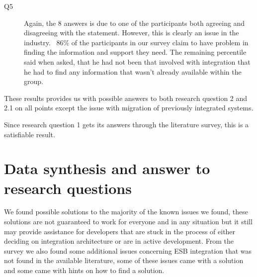 \documentclass{llncs}
\begin{document}
\begin{description}
\item[Q5] Again, the 8 answers is due to one of the participants both agreeing and disagreeing with the statement. However, this is clearly an issue in the industry. ~86\% of the participants in our survey claim to have problem in finding the information and support they need. The remaining percentile said when asked, that he had not been that involved with integration that he had to find any information that wasn't already available within the group.
\end{description}

These results provides us with possible answers to both research question 2 and 2.1 on all points except the issue with migration of previously integrated systems.

Since research question 1 gets its answers through the literature survey, this is a satisfiable result.

\section{Data synthesis and answer to research questions}
We found possible solutions to the majority of the known issues we found, these solutions are not guaranteed to work for everyone and in any situation but it still may provide assistance for developers that are stuck in the process of either deciding on integration architecture or are in active development.
From the survey we also found some additional issues concerning ESB integration that was not found in the available literature, some of these issues came with a solution and some came with hints on how to find a solution.
\end{document}
